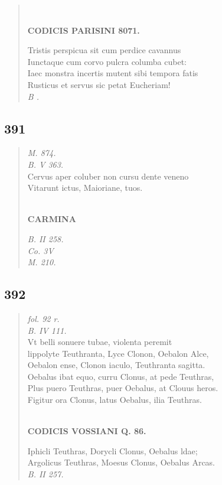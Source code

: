 \documentclass[11pt, a4paper]{report}
\begin{document}
\begin{verse}
        ﻿\pagebreak 
    \begin{center} \textbf{CODICIS PARISINI 8071.} \end{center} \marginpar{[305]} Tristis perspicua sit cum perdice cavannus \\ Iunctaque cum corvo pulcra columba cubet: \\ Iaec monstra incertis mutent sibi tempora fatis \\ Rusticus et servus sic petat Eucheriam! \\ \textit{B .} \\ 
      \end{verse}
  
            \subsection*{391}
      \begin{verse}
      \textit{M. 874.} \\ \textit{B. V 363.} \\ Cervus aper coluber non cursu dente veneno \\ Vitarunt ictus, Maioriane, tuos. \\ 
        ﻿\pagebreak 
    \begin{center} \textbf{CARMINA} \end{center}\textit{B. II 258.} \\ \textit{Co. 3V} \\ \textit{M. 210.} \\ 
      \end{verse}
  
            \subsection*{392}
      \begin{verse}
      \textit{fol. 92 r.} \\ \textit{B. IV 111.} \\ Vt belli sonuere tubae, violenta peremit \\ lippolyte Teuthranta, Lyce Clonon, Oebalon Alce, \\ Oebalon ense, Clonon iaculo, Teuthranta sagitta. \\ Oebalus ibat equo, curru Clonus, at pede Teuthras, \\ Plus puero Teuthras, puer Oebalus, at Clouus heros. \\ Figitur ora Clonus, latus Oebalus, ilia Teuthras. \\ 
        ﻿\pagebreak 
    \begin{center} \textbf{CODICIS VOSSIANI Q. 86.} \end{center} \marginpar{[307]} Iphicli Teuthras, Dorycli Clonus, Oebalus ldae; \\ Argolicus Teuthras, Moesus Clonus, Oebalus Arcas. \\ \textit{B. II 257.} \\ 
      \end{verse}
  
\end{document}
